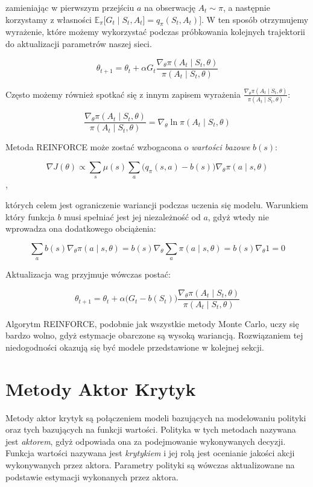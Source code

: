 \documentclass[licencjacka]{pracamgr}
\begin{document}
zamieniając w pierwszym przejściu $a$ na obserwację $A_t \sim \pi$, a następnie korzystamy z własności $ \mathbb{E}_\pi \big[ G_t \mid S_t, A_t \big] = q_\pi(S_t, A_t) \big] $. W ten sposób otrzymujemy wyrażenie, które możemy wykorzystać podczas próbkowania kolejnych trajektorii do aktualizacji parametrów naszej sieci.

$$ \theta_{t+1} = \theta_t + \alpha G_t \frac{\nabla_\theta \pi(A_t \mid S_t, \theta)}{\pi(A_t \mid S_t, \theta)} $$

Często możemy również spotkać się z innym zapisem wyrażenia $  \frac{\nabla_\theta \pi(A_t \mid S_t, \theta)}{\pi(A_t \mid S_t, \theta)}$:

$$  \frac{\nabla_\theta \pi(A_t \mid S_t, \theta)}{\pi(A_t \mid S_t, \theta)} = \nabla_\theta \ln \pi(A_t \mid S_t, \theta) $$

Metoda REINFORCE może zostać wzbogacona o \emph{wartości bazowe} $b(s)$:

$$ \nabla J(\theta) \propto \sum_s \mu(s) \sum_a \Big( q_\pi(s, a) - b(s) \Big) \nabla_\theta \pi(a \mid s, \theta) $$,

których celem jest ograniczenie wariancji podczas uczenia się modelu. Warunkiem który funkcja $b$ musi spełniać jest jej niezależność od $a$, gdyż wtedy nie wprowadza ona dodatkowego obciążenia:

$$ \sum_a b(s) \nabla_\theta \pi(a \mid s, \theta) = b(s) \nabla_\theta \sum_a \pi(a \mid s, \theta) = b(s) \nabla_\theta 1 = 0 $$

Aktualizacja wag przyjmuje wówczas postać:

$$ \theta_{t+1} = \theta_t + \alpha \Big( G_t - b(S_t) \Big) \frac{\nabla_\theta \pi(A_t \mid S_t, \theta)}{\pi(A_t \mid S_t, \theta)} $$


Algorytm REINFORCE, podobnie jak wszystkie metody Monte Carlo, uczy się bardzo wolno, gdyż estymacje obarczone są wysoką wariancją. Rozwiązaniem tej niedogodności okazują się być modele przedstawione w kolejnej sekcji.

\section{Metody Aktor Krytyk}

Metody aktor krytyk są połączeniem modeli bazujących na modelowaniu polityki oraz tych bazujących na funkcji wartości. Polityka w tych metodach nazywana jest \emph{aktorem}, gdyż odpowiada ona za podejmowanie wykonywanych decyzji. Funkcja wartości nazywana jest \emph{krytykiem} i jej rolą jest ocenianie jakości akcji wykonywanych przez aktora. Parametry polityki są wówczas aktualizowane na podstawie estymacji wykonanych przez aktora.
\end{document}
